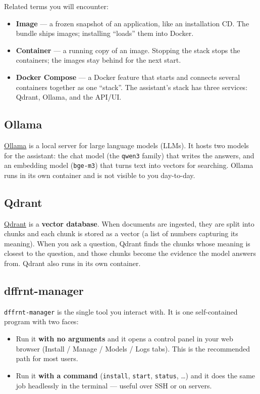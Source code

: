 \documentclass[11pt,letterpaper]{article}
\begin{document}
Related terms you will encounter:

\begin{itemize}
  \item \textbf{Image} --- a frozen snapshot of an application, like an
        installation CD. The bundle ships images; installing ``loads'' them
        into Docker.
  \item \textbf{Container} --- a running copy of an image. Stopping the stack
        stops the containers; the images stay behind for the next start.
  \item \textbf{Docker Compose} --- a Docker feature that starts and connects
        several containers together as one ``stack''. The assistant's stack
        has three services: Qdrant, Ollama, and the API/UI.
\end{itemize}

\subsection{Ollama}

\href{https://ollama.com/}{Ollama} is a local server for large language
models (LLMs). It hosts two models for the assistant: the chat model (the
\texttt{qwen3} family) that writes the answers, and an embedding model
(\texttt{bge-m3}) that turns text into vectors for searching. Ollama runs in
its own container and is not visible to you day-to-day.

\subsection{Qdrant}

\href{https://qdrant.tech/}{Qdrant} is a \textbf{vector database}. When
documents are ingested, they are split into chunks and each chunk is stored
as a vector (a list of numbers capturing its meaning). When you ask a
question, Qdrant finds the chunks whose meaning is closest to the question,
and those chunks become the evidence the model answers from. Qdrant also runs
in its own container.

\subsection{dffrnt-manager}

\texttt{dffrnt-manager} is the single tool you interact with. It is one
self-contained program with two faces:

\begin{itemize}
  \item Run it \textbf{with no arguments} and it opens a control panel in
        your web browser (Install / Manage / Models / Logs tabs). This is the
        recommended path for most users.
  \item Run it \textbf{with a command} (\texttt{install}, \texttt{start},
        \texttt{status}, \ldots) and it does the same job headlessly in the
        terminal --- useful over SSH or on servers.
\end{itemize}
\end{document}

